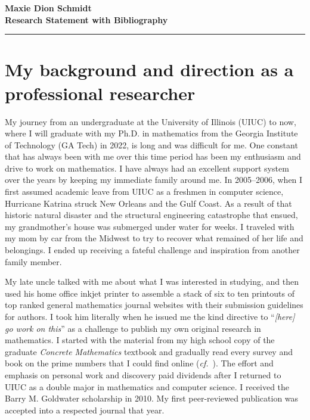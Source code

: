 \documentclass[10pt,reqno,letterpaper]{article}
\theoremstyle{plain}
\numberwithin{theorem}{section}
\theoremstyle{definition}
\newcommand{\cf}[0]{\emph{cf.}\ }
\begin{document}
\noindent 
{\bfseries\Large Maxie Dion Schmidt} \\[0.5ex]
{\bfseries\Large Research Statement with Bibliography} \\ 
\hrule\medskip

\section{My background and direction as a professional researcher}

My journey from an undergraduate at the University of Illinois (UIUC) to now, 
where I will graduate with my Ph.D. in mathematics from the 
Georgia Institute of Technology (GA Tech) in 2022, 
is long and was difficult for me. 
One constant that has always been with me over this time period has been my 
enthusiasm and drive to work on mathematics. 
I have always had an excellent support system over the years 
by keeping my immediate family around me. 
In 2005--2006, when I first assumed academic leave from UIUC as a freshmen in computer science, 
Hurricane Katrina struck New Orleans and the Gulf Coast. 
As a result of that historic natural disaster and the 
structural engineering catastrophe that ensued, my grandmother's house 
was submerged under water for weeks. I traveled with my mom by car from the Midwest to try to 
recover what remained of her life and belongings. I ended up 
receiving a fateful challenge and inspiration from another family member. 

My late uncle talked with me about what I was interested in studying, and then used 
his home office inkjet printer to assemble a stack of six to ten printouts of top ranked general 
mathematics journal websites with their submission guidelines for authors. 
I took him literally when he issued me the kind directive to ``\emph{[here] go work on this}'' as a challenge 
to publish my own original research in mathematics. 
I started with the material from my high school copy of the graduate 
\emph{Concrete Mathematics} textbook \cite{GKP} and gradually 
read every survey and book on the prime numbers that I could find online 
(\cf \cite{PRIMEREC}). 
The effort and emphasis on personal work and 
discovery paid dividends after I returned 
to UIUC as a double major in mathematics and computer science. 
I received the Barry M. Goldwater scholarship in 2010. 
My first peer-reviewed publication was accepted into a respected journal that year. 
\end{document}
